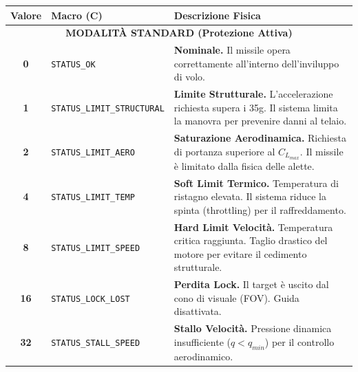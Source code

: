 \documentclass[12pt,a4paper]{article}
\begin{document}
\begin{table}[ht!]
    \centering
    \renewcommand{\arraystretch}{1.4} %
    \begin{tabular}{|c|l|p{7.5cm}|}
        \hline
        \textbf{Valore} & \textbf{Macro (C)} & \textbf{Descrizione Fisica} \\
        \hline
        \multicolumn{3}{|c|}{\textbf{MODALITÀ STANDARD (Protezione Attiva)}} \\
        \hline
        \textbf{0} & \texttt{STATUS\_OK} & \textbf{Nominale.} Il missile opera correttamente all'interno dell'inviluppo di volo. \\
        \hline
        \textbf{1} & \texttt{STATUS\_LIMIT\_STRUCTURAL} & \textbf{Limite Strutturale.} L'accelerazione richiesta supera i 35g. Il sistema limita la manovra per prevenire danni al telaio. \\
        \hline
        \textbf{2} & \texttt{STATUS\_LIMIT\_AERO} & \textbf{Saturazione Aerodinamica.} Richiesta di portanza superiore al $C_{L_{max}}$. Il missile è limitato dalla fisica delle alette. \\
        \hline
        \textbf{4} & \texttt{STATUS\_LIMIT\_TEMP} & \textbf{Soft Limit Termico.} Temperatura di ristagno elevata. Il sistema riduce la spinta (throttling) per il raffreddamento. \\
        \hline
        \textbf{8} & \texttt{STATUS\_LIMIT\_SPEED} & \textbf{Hard Limit Velocità.} Temperatura critica raggiunta. Taglio drastico del motore per evitare il cedimento strutturale. \\
        \hline
        \textbf{16} & \texttt{STATUS\_LOCK\_LOST} & \textbf{Perdita Lock.} Il target è uscito dal cono di visuale (FOV). Guida disattivata. \\
        \hline
        \textbf{32} & \texttt{STATUS\_STALL\_SPEED} & \textbf{Stallo Velocità.} Pressione dinamica insufficiente ($q < q_{min}$) per il controllo aerodinamico. \\
        \hline
        

\end{tabular}
\end{table}
\end{document}
